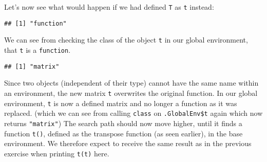 \documentclass[11,]{article}
\newenvironment{Shaded}{\begin{snugshade}}{\end{snugshade}}
\newcommand{\KeywordTok}[1]{\textcolor[rgb]{0.13,0.29,0.53}{\textbf{{#1}}}}
\newcommand{\DataTypeTok}[1]{\textcolor[rgb]{0.13,0.29,0.53}{{#1}}}
\newcommand{\DecValTok}[1]{\textcolor[rgb]{0.00,0.00,0.81}{{#1}}}
\newcommand{\StringTok}[1]{\textcolor[rgb]{0.31,0.60,0.02}{{#1}}}
\newcommand{\CommentTok}[1]{\textcolor[rgb]{0.56,0.35,0.01}{\textit{{#1}}}}
\newcommand{\OtherTok}[1]{\textcolor[rgb]{0.56,0.35,0.01}{{#1}}}
\newcommand{\NormalTok}[1]{{#1}}
\begin{document}
Let's now see what would happen if we had defined \texttt{T} as
\texttt{t} instead:

\begin{Shaded}
\end{Shaded}

\begin{verbatim}
## [1] "function"
\end{verbatim}

We can see from checking the class of the object \texttt{t} in our
global environment, that \texttt{t} is a \texttt{function}.

\begin{Shaded}
\end{Shaded}

\begin{verbatim}
## [1] "matrix"
\end{verbatim}

Since two objects (independent of their type) cannot have the same name
within an environment, the new matrix \texttt{t} overwrites the original
function. In our global environment, \texttt{t} is now a defined matrix
and no longer a function as it was replaced. (which we can see from
calling \texttt{class} on \texttt{.GlobalEnv\$t} again which now returns
\texttt{"matrix"}) The search path should now move higher, until it
finds a function \texttt{t()}, defined as the transpose function (as
seen earlier), in the base environment. We therefore expect to receive
the same result as in the previous exercise when printing \texttt{t(t)}
here.
\end{document}
